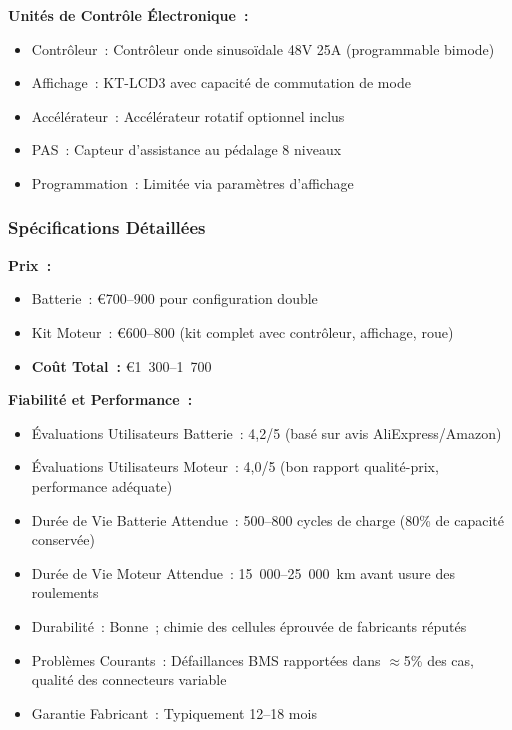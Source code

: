 \documentclass[12pt,a4paper]{article}
\begin{document}
\textbf{Unités de Contrôle Électronique~:}
\begin{itemize}
    \item Contrôleur~: Contrôleur onde sinusoïdale 48V 25A (programmable bimode)
    \item Affichage~: KT-LCD3 avec capacité de commutation de mode
    \item Accélérateur~: Accélérateur rotatif optionnel inclus
    \item PAS~: Capteur d'assistance au pédalage 8 niveaux
    \item Programmation~: Limitée via paramètres d'affichage
\end{itemize}

\subsubsection{Spécifications Détaillées}

\textbf{Prix~:}
\begin{itemize}
    \item Batterie~: €700--900 pour configuration double \cite{aliexpress-batteries}
    \item Kit Moteur~: €600--800 (kit complet avec contrôleur, affichage, roue) \cite{aliexpress-batteries}
    \item \textbf{Coût Total~:} €1~300--1~700
\end{itemize}

\textbf{Fiabilité et Performance~:}
\begin{itemize}
    \item Évaluations Utilisateurs Batterie~: 4,2/5 (basé sur avis AliExpress/Amazon) \cite{aliexpress-batteries, amazon-components}
    \item Évaluations Utilisateurs Moteur~: 4,0/5 (bon rapport qualité-prix, performance adéquate) \cite{ebike-review}
    \item Durée de Vie Batterie Attendue~: 500--800 cycles de charge (80\% de capacité conservée)
    \item Durée de Vie Moteur Attendue~: 15~000--25~000~km avant usure des roulements
    \item Durabilité~: Bonne~; chimie des cellules éprouvée de fabricants réputés
    \item Problèmes Courants~: Défaillances BMS rapportées dans $\approx$5\% des cas, qualité des connecteurs variable
    \item Garantie Fabricant~: Typiquement 12--18 mois
\end{itemize}
\end{document}

